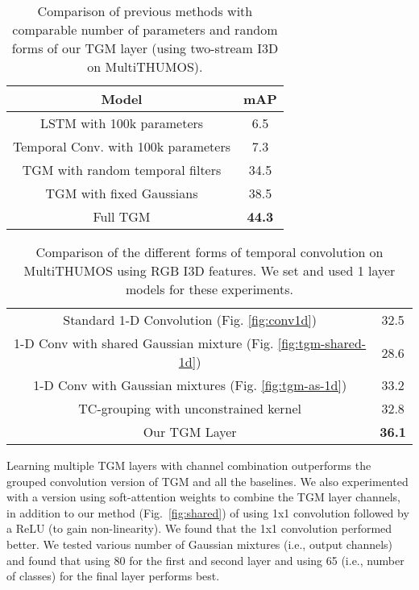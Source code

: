 \documentclass{article}
\begin{document}
\begin{table}
\caption{Comparison of previous methods with comparable number of parameters and random forms of our TGM layer (using two-stream I3D on MultiTHUMOS).}
\label{tab:results-other}
\centering
\begin{tabular}{c|c}
\toprule
Model & mAP \\
\midrule
LSTM with 100k parameters    & 6.5\\
Temporal Conv. with 100k parameters & 7.3\\
TGM with random temporal filters & 34.5\\
TGM with fixed Gaussians  & 38.5\\
Full TGM   & \bf{44.3}\\
\bottomrule
\end{tabular}
\end{table}



\begin{table}
\caption{Comparison of the different forms of temporal convolution on MultiTHUMOS using RGB I3D features. We set  and used 1 layer models for these experiments.}
\label{tab:layer-types}
\centering
\setlength\extrarowheight{0pt}
\begin{tabular}{c|c}
\toprule
Standard 1-D Convolution (Fig. \ref{fig:conv1d})      & 32.5  \\
1-D Conv with shared Gaussian mixture (Fig. \ref{fig:tgm-shared-1d})         & 28.6  \\
1-D Conv with Gaussian mixtures (Fig. \ref{fig:tgm-as-1d})      & 33.2 \\
TC-grouping with unconstrained kernel     & 32.8   \\
Our TGM Layer   & \textbf{36.1} \\
\bottomrule
\end{tabular}
\end{table}


Learning multiple TGM layers with channel combination outperforms the grouped convolution version of TGM and all the baselines. We also experimented with a version using soft-attention weights to combine the TGM layer channels, in addition to our method (Fig.~\ref{fig:shared}) of using 1x1 convolution followed by a ReLU (to gain non-linearity). We found that the 1x1 convolution performed better. We tested various number of Gaussian mixtures (i.e., output channels) and found that using 80 for the first and second layer and using 65 (i.e., number of classes) for the final layer performs best.
\end{document}
